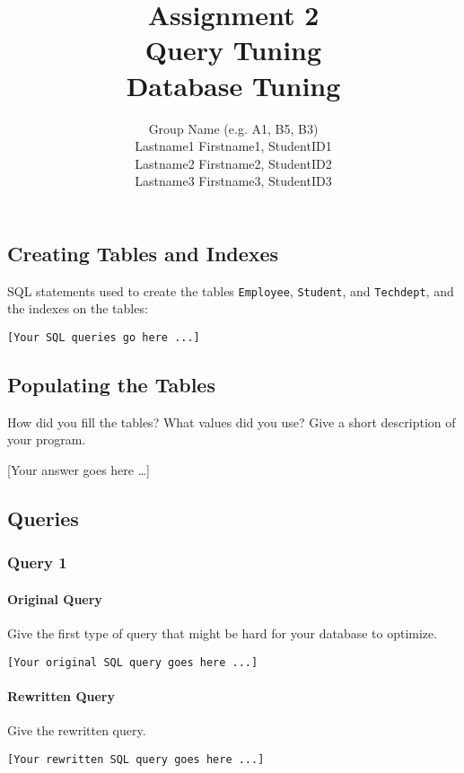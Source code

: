 \documentclass[11pt]{scrartcl}
\title{
  \textbf{\large Assignment 2} \\
  Query Tuning \\
  {\large Database Tuning}
}
\author{
  Group Name (e.g. A1, B5, B3) \\
  \large Lastname1 Firstname1, StudentID1 \\
  \large Lastname2 Firstname2, StudentID2 \\
  \large Lastname3 Firstname3, StudentID3
}
\newcommand{\youranswerhere}{[Your answer goes here \ldots]}
\begin{document}
\maketitle\thispagestyle{empty}

\subsection*{Creating Tables and Indexes}

SQL statements used to create the tables \texttt{Employee}, \texttt{Student}, and \texttt{Techdept}, and the indexes on the tables:

\begin{lstlisting}[style=dbtsql]
[Your SQL queries go here ...]
\end{lstlisting}

\subsection*{Populating the Tables}

How did you fill the tables? What values did you use? Give a short description of your program.

\youranswerhere{}

\subsection*{Queries}

\subsubsection*{Query 1}

\paragraph{Original Query}

Give the first type of query that might be hard for your database to optimize.

\begin{lstlisting}[style=dbtsql]
[Your original SQL query goes here ...]
\end{lstlisting}

\paragraph{Rewritten Query}

Give the rewritten query.

\begin{lstlisting}[style=dbtsql]
[Your rewritten SQL query goes here ...]
\end{lstlisting}
\end{document}
